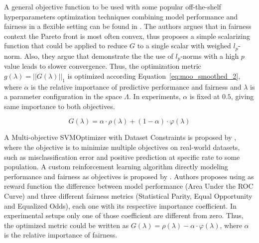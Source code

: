 A general objective function to be used with some popular off-the-shelf hyperparameters optimization techniques combining model performance and fairness in a flexible setting can be found in \cite{Cruz2021}. The authors argues that in fairness context the Pareto front is most often convex, thus proposes a simple scalarizing function that could be applied to reduce $G$ to a single scalar with weighed $l_p$-norm. Also, they argue that \cite{GIAGKIOZIS2015338} demonstrate the the  use  of $l_p$-norms with a high $p$ value leads to slower convergence. Thus, the optimization metric $g(\lambda) = ||G(\lambda)||_1$ is optimized according Equation~\ref{eq:moo_smoothed_2}, where $\alpha$ is the relative importance of predictive performance and fairness and $\lambda$ is a parameter configuration in the space $\Lambda$. In experiments, $\alpha$ is fixed at $0.5$, giving same importance to both objectives.

\begin{equation} \label{eq:moo_smoothed_2}
    G(\lambda) = \alpha \cdot \rho(\lambda) + (1-\alpha) \cdot \varphi(\lambda)
\end{equation}

A Multi-objective SVMOptimizer with Dataset Constraints is proposed by \cite{Goh2016}, where the objective is to minimize multiple objectives on real-world datasets, such as misclassification error and positive prediction at specific rate to some population. A custom reinforcement learning algorithm directly modeling performance and fairness as objectives is proposed by \cite{Petrovic2021}. Authors proposes using as reward function the difference between model performance (Area Under the ROC Curve) and three different fairness metrics (Statistical Parity, Equal Opportunity and Equalized Odds), each one with its respective importance coefficient. In experimental setups only one of those coefficient are different from zero. Thus, the optimized metric could be written as $G(\lambda) = \rho(\lambda) - \alpha \cdot \varphi(\lambda)$, where $\alpha$ is the relative importance of fairness.


